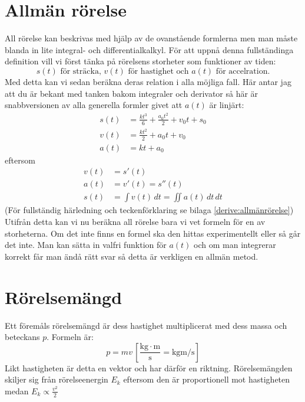 \section{Allmän rörelse}
All rörelse kan beskrivas med hjälp av de ovanstående formlerna men man måste blanda in lite integral- och differentialkalkyl. För att uppnå denna fullständinga definition vill vi först tänka på rörelsens storheter som funktioner av tiden:
\begin{equation*}
    s(t) \text{ för sträcka, } v(t) \text{ för hastighet och } a(t) \text{ för accelration.}
\end{equation*}
Med detta kan vi sedan beräkna deras relation i alla möjliga fall. Här antar jag att du är bekant med tanken bakom integraler och derivator så här är snabbversionen av alla generella formler givet att $a(t)$ är linjärt:
\begin{align*}
    s(t) &= \frac{kt^3}{6} + \frac{a_0t^2}{2} + v_0t + s_0 \\
    v(t) &= \frac{kt^2}{2} + a_0t + v_0 \\
    a(t) &= kt + a_0
\end{align*}
eftersom
\begin{align*}
    v(t) &= s'(t) \\
    a(t) &= v'(t) = s''(t) \\
    s(t) &= \int{v(t)}\, dt = \iint{a(t)}\, dt\, dt
\end{align*}
(För fullständig härledning och teckenförklaring se bilaga \ref{derive:allmänrörelse}) Utifrån detta kan vi nu beräkna all rörelse bara vi vet formeln för en av storheterna. Om det inte finns en formel ska den hittas experimentellt eller så går det inte. Man kan sätta in valfri funktion för $a(t)$ och om man integrerar korrekt får man ändå rätt svar så detta är verkligen en allmän metod.

\section{Rörelsemängd}
Ett föremåls rörelsemängd är dess hastighet multiplicerat med dess massa och beteckans $p$. Formeln är: \[ p = mv\, \left[\mathrm{\frac{kg \cdot m}{s}  = kgm/s}\right] \] Likt hastigheten är detta en vektor och har därför en riktning. Rörelsemängden skiljer sig från rörelseenergin $E_k$ eftersom den är proportionell mot hastigheten medan $E_k \propto \frac{v^2}{2}$ 